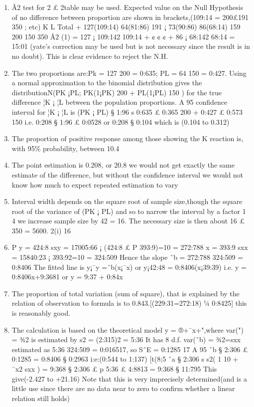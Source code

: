\documentclass[a4paper,12pt]{article}
\begin{document}
\begin{enumerate}
\item  Â2 test for 2 £ 2table may be used. Expected value on the Null Hypothesis of
no difference between proportion are shown in brackets,(109:14 = 200£191
350 ; etc)
K L Total
+ 127(109:14) 64(81:86) 191
¡ 73(90:86) 86(68:14) 159
200 150 350
Â2
(1) =
127 ¡ 109:142
109:14
+ ¢ ¢ ¢ +
86 ¡ 68:142
68:14
= 15:01
(yate’s correction may be used but is not necessary since the result is in no doubt). This
is clear evidence to reject the N.H.
\item The two proportions are:Pk = 127
200 = 0:635; PL = 64
150 = 0:427. Using a normal
approximation to the binomial distribution gives the distributionN(PK ¡PL; PK(1¡PK)
200 +
PL(1¡PL)
150 ) for the true difference ¦K ¡ ¦L between the population proportions. A 95%
confidence interval for ¦K ¡ ¦L is
(PK ¡ PL) § 1:96
s
0:635 £ 0:365
200
+
0:427 £ 0:573
150
i.e. 0:208 § 1:96 £ 0:0528 or 0:208 § 0:104 which is (0.104 to 0.312)
\item  The proportion of positive response among those showing the K reaction is, with
95\% probability, between 10.4%
\item  The point estimation is 0.208, or 20.8%
we would not get exactly the same estimate of the difference, but without the confidence
interval we would not know how much to expect repeated estimation to vary
\item Interval width depends on the square root of sample size,though the square root
of the variance of (PK ¡ PL) and so to narrow the interval by a factor 1
4 we increase
sample size by 42 = 16. The necessary size is then about 16 £ 350 = 5600.
2(i)
16
\item  P
y = 424:8 sxy = 17005:66 ¡ (424:8 £ P 393:9)=10 = 272:788
x = 393:9 sxx = 15840:23 ¡ 393:92=10 = 324:509
Hence the slope
ˆb
=
272:788
324:509
= 0:8406
The fitted line is y¡¯y =ˆb(x¡¯x) or y¡42:48 = 0:8406(x¡39:39) i.e. y = 0:8406x+9:3681
or y = 9:37 + 0:84x
\item The proportion of total variation (sum of square), that is explained by the relation
of observation to formula is to 0.843.[(229:31=272:18) ¼ 0:8425] this is reasonably
good.
\item The calculation is based on the theoretical model y = ®+¯x+",where var(") =
¾2 is estimated by s2 = (2:315)2 = 5:36 It has 8 d.f. var(ˆb) = ¾2=sxx estimated as
5:36
324:509 = 0:016517, so SˆE = 0:1285
17
A 95%
ˆb
§ 2:306 £ 0:1285 = 0:8406 § 0:2963 i:e:(0:544 to 1:137)
[t(8;5%
ˆa § 2:306
s
s2(
1
10
+
¯x2
sxx
) = 9:368 § 2:306 £
p
5:36 £ 4:8813 = 9:368 § 11:795
This give(-2.427 to +21.16)
Note that this is very imprecisely determined(and is a little use since there are no data
near to zero to confirm whether a linear relation still holds)
\end{enumerate}
\end{document}
